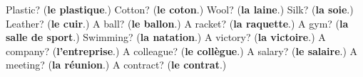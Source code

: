 \begin{tcolorbox}[breakable,colback=teal!4,colframe=teal!35!black,title={Before you move on}]
Plastic? (\textbf{le plastique}.) Cotton? (\textbf{le coton}.) Wool? (\textbf{la laine}.) Silk? (\textbf{la soie}.) Leather? (\textbf{le cuir}.) A ball? (\textbf{le ballon}.) A racket? (\textbf{la raquette}.) A gym? (\textbf{la salle de sport}.) Swimming? (\textbf{la natation}.) A victory? (\textbf{la victoire}.) A company? (\textbf{l'entreprise}.) A colleague? (\textbf{le collègue}.) A salary? (\textbf{le salaire}.) A meeting? (\textbf{la réunion}.) A contract? (\textbf{le contrat}.)
\end{tcolorbox}
